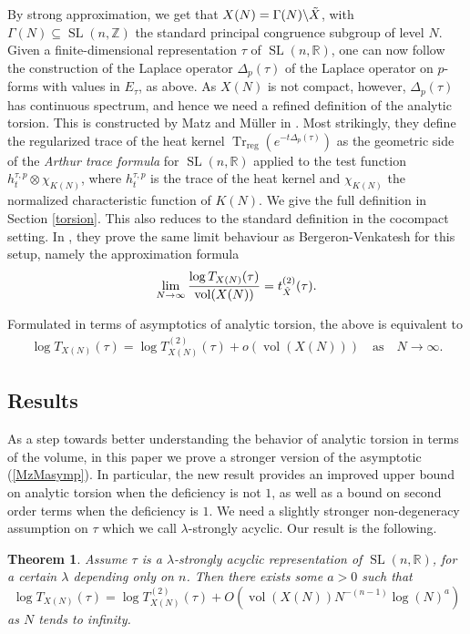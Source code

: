 \documentclass[11pt,reqno]{amsart}
\numberwithin{equation}{section}
\newtheorem{thm}{Theorem}[section]
\theoremstyle{definition}
\theoremstyle{remark}
\newcommand{\SL}{\operatorname{SL}}
\newcommand{\Trreg}{\operatorname{Tr}_{\operatorname{reg}}}
\newcommand{\vol}{\operatorname{vol}}
\newcommand{\Z}{\mathbb{Z}}
\newcommand{\R}{\mathbb{R}}
\renewcommand{\subset}{\subseteq}
\begin{document}
\noindent By strong approximation, we get that $X(N) = \Gamma(N)\backslash \Tilde{X}$, with $\Gamma(N)\subset \SL(n,\Z)$ the standard principal congruence subgroup of level $N$. Given a finite-dimensional representation $\tau$ of $\SL(n,\R)$, one can now follow the construction of the Laplace operator $\Delta_p(\tau)$ of the Laplace operator on $p$-forms with values in $E_\tau$, as above. As $X(N)$ is not compact, however, $\Delta_p(\tau)$ has continuous spectrum, and hence we need a refined definition of the analytic torsion. This is constructed by Matz and Müller in \cite{MzM1}. Most strikingly, they define the regularized trace of the heat kernel $\Trreg(e^{-t\Delta_p(\tau)})$ as the geometric side of the \textit{Arthur trace formula} for $\SL(n,\R)$ applied to the test function $h_t^{\tau,p}\otimes \chi_{K(N)}$, where $h_t^{\tau,p}$ is the trace of the heat kernel and $\chi_{K(N)}$ the normalized characteristic function of $K(N)$. We give the full definition in 
Section \ref{torsion}. This also reduces to the standard definition in the cocompact setting. In \cite{MzM2}, they prove the same limit behaviour as Bergeron-Venkatesh for this setup, namely the approximation formula
\begin{align}\label{MzM2mainresult}
    \lim_{N\to\infty}\frac{\log T_{X(N)}(\tau)}{\vol(X(N))} = t^{(2)}_{\Tilde{X}}(\tau).
\end{align}

\noindent Formulated in terms of asymptotics of analytic torsion, the above is equivalent to
\begin{align}\label{MzMasymp}
    \log T_{X(N)}(\tau)=\log T^{(2)}_{X(N)}(\tau)+o(\vol(X(N))) \quad\text{as}\quad N\to\infty.
\end{align}

\subsection*{Results} 

As a step towards better understanding the behavior of analytic torsion in terms of the volume, in this paper we prove a stronger version of the asymptotic (\ref{MzMasymp}). In particular, the new result provides an improved upper bound on analytic torsion when the deficiency is not $1$, as well as a bound on second order terms when the deficiency is $1$. We need a slightly stronger non-degeneracy assumption on $\tau$ which we call $\lambda$-strongly acyclic. Our result is the following.
\begin{thm}\label{mytheorem}
    Assume $\tau$ is a $\lambda$-strongly acyclic representation of $\SL(n,\R)$, for a certain $\lambda$ depending only on $n$. Then there exists some $a>0$ such that
    $$\log T_{X(N)}(\tau) = \log T_{X(N)}^{(2)}(\tau)+O(\vol(X(N))N^{-(n-1)}\log(N)^a)$$
    as $N$ tends to infinity.
\end{thm}
\end{document}
